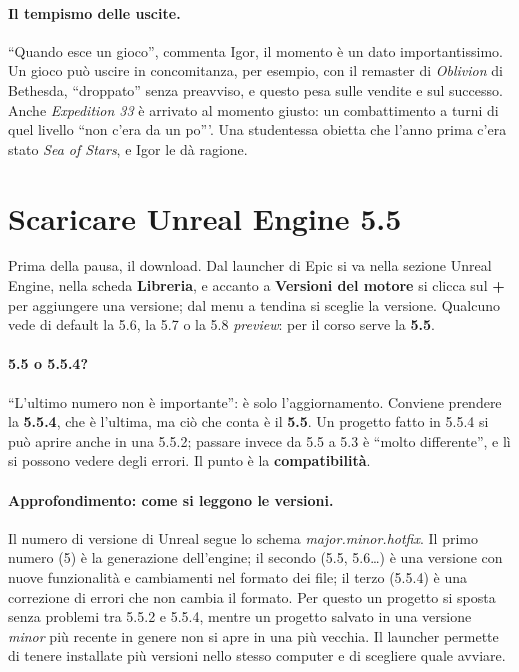 \paragraph{Il tempismo delle uscite.} ``Quando esce un gioco'', commenta Igor, il momento
è un dato importantissimo. Un gioco può uscire in concomitanza, per esempio, con il
remaster di \emph{Oblivion} di Bethesda, ``droppato'' senza preavviso, e questo pesa
sulle vendite e sul successo. Anche \emph{Expedition 33} è arrivato al momento giusto:
un combattimento a turni di quel livello ``non c'era da un po'''. Una studentessa
obietta che l'anno prima c'era stato \emph{Sea of Stars}, e Igor le dà ragione.

\section{Scaricare Unreal Engine 5.5}
\label{ue1:sec:download}

Prima della pausa, il download. Dal launcher di Epic si va nella sezione Unreal Engine,
nella scheda \textbf{Libreria}, e accanto a \textbf{Versioni del motore} si clicca sul
\textbf{+} per aggiungere una versione; dal menu a tendina si sceglie la versione.
Qualcuno vede di default la 5.6, la 5.7 o la 5.8 \emph{preview}: per il corso serve la
\textbf{5.5}.

\paragraph{5.5 o 5.5.4?} ``L'ultimo numero non è importante'': è solo l'aggiornamento.
Conviene prendere la \textbf{5.5.4}, che è l'ultima, ma ciò che conta è il \textbf{5.5}.
Un progetto fatto in 5.5.4 si può aprire anche in una 5.5.2; passare invece da 5.5 a
5.3 è ``molto differente'', e lì si possono vedere degli errori. Il punto è la
\textbf{compatibilità}.

\paragraph{Approfondimento: come si leggono le versioni.} Il numero di versione di Unreal
segue lo schema \emph{major.minor.hotfix}. Il primo numero (5) è la generazione
dell'engine; il secondo (5.5, 5.6\ldots) è una versione con nuove funzionalità e
cambiamenti nel formato dei file; il terzo (5.5.4) è una correzione di errori che non
cambia il formato. Per questo un progetto si sposta senza problemi tra 5.5.2 e 5.5.4,
mentre un progetto salvato in una versione \emph{minor} più recente in genere non si
apre in una più vecchia. Il launcher permette di tenere installate più versioni nello
stesso computer e di scegliere quale avviare.

